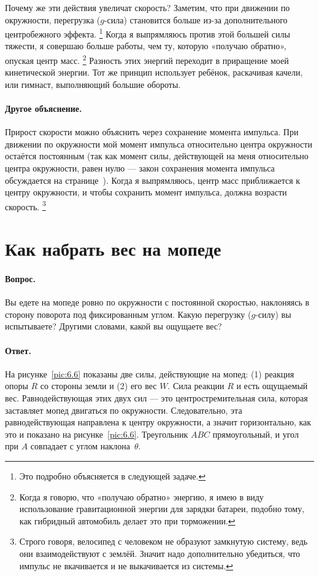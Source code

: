 Почему же эти действия увеличат скорость?
Заметим, что при движении по окружности, перегрузка ($g$-сила) становится больше из-за дополнительного центробежного эффекта.%
\footnote{Это подробно объясняется в следующей задаче.}
Когда я выпрямляюсь против этой большей силы тяжести, я совершаю больше работы, чем ту, которую «получаю обратно», опуская центр масс.%
\footnote{Когда я говорю, что «получаю обратно» энергию, я имею в виду использование гравитационной энергии для зарядки батареи, подобно тому, как гибридный автомобиль делает это при торможении.}
Разность этих энергий переходит в приращение моей кинетической энергии.
Тот же принцип использует ребёнок, раскачивая качели, или гимнаст, выполняющий большие обороты.

\paragraph{Другое объяснение.}
Прирост скорости можно объяснить через сохранение момента импульса.
При движении по окружности мой момент импульса относительно центра окружности остаётся постоянным (так как момент силы, действующей на меня относительно центра окружности, равен нулю --- закон сохранения момента импульса обсуждается на странице~\pageref{Закон сохранения момента импульса}).
Когда я выпрямляюсь, центр масс приближается к центру окружности, и чтобы сохранить момент импульса, должна возрасти скорость.%
\footnote{Строго говоря, велосипед с человеком не образуют замкнутую систему, ведь они взаимодействуют с землёй. Значит надо дополнительно убедиться, что импульс не вкачивается и не выкачивается из системы.\pr}


\section{Как набрать вес на мопеде}

\paragraph{Вопрос.}
Вы едете на мопеде ровно по окружности с постоянной скоростью, наклоняясь в сторону поворота под фиксированным углом.
Какую перегрузку ($g$-силу) вы испытываете?
Другими словами, какой вы ощущаете вес?

\paragraph{Ответ.}
На рисунке~\ref{pic:6.6} показаны две силы, действующие на мопед:
(1) реакция опоры $R$ со стороны земли и (2) его вес $W$.
Сила реакции $R$ и есть ощущаемый вес.
Равнодействующая этих двух сил — это центростремительная сила, которая заставляет мопед двигаться по окружности.
Следовательно, эта равнодействующая направлена к центру окружности, а значит горизонтально, как это и показано на рисунке~\ref{pic:6.6}.
Треугольник $ABC$ прямоугольный, и угол при $A$ совпадает с углом наклона~$\theta$.

